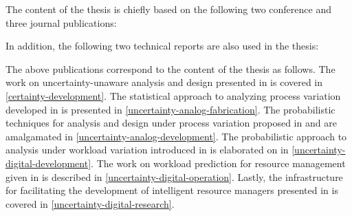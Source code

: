 The content of the thesis is chiefly based on the following two conference and
three journal publications:

\printbibliography[heading=none,keyword=own]

In addition, the following two technical reports are also used in the thesis:

\printbibliography[heading=none,keyword=own-unpublished]

The above publications correspond to the content of the thesis as follows. The
work on uncertainty-unaware analysis and design presented in \cite{ukhov2012} is
covered in \cref{certainty-development}. The statistical approach to analyzing
process variation developed in \cite{ukhov2014a} is presented in
\cref{uncertainty-analog-fabrication}. The probabilistic techniques for analysis
and design under process variation proposed in \cite{ukhov2014b} and
\cite{ukhov2015} are amalgamated in \cref{uncertainty-analog-development}. The
probabilistic approach to analysis under workload variation introduced in
\cite{ukhov2017a} is elaborated on in \cref{uncertainty-digital-development}.
The work on workload prediction for resource management given in
\cite{ukhov2017b} is described in \cref{uncertainty-digital-operation}. Lastly,
the infrastructure for facilitating the development of intelligent resource
managers presented in \cite{ukhov2017c} is covered in
\cref{uncertainty-digital-research}.
